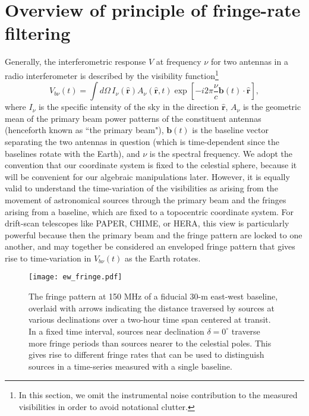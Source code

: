 \documentclass[twocolumn,apj,numberedappendix]{emulateapj}
\newcommand{\rhat}{\hat{\mathbf{r}}}
\begin{document}
\section{Overview of principle of fringe-rate filtering}
\label{sec:overview}
Generally, the interferometric response $V$ at frequency $\nu$ for two antennas in a radio interferometer is described
by the visibility function\footnote{In this section, we omit the instrumental noise contribution to the measured visibilities in order to avoid notational clutter.}
\begin{equation}
\label{eq:originalVis}
V_{b\nu}(t)=\int d\Omega \, {I_\nu(\rhat) A_\nu(\rhat,t) \exp \left[-i2\pi \frac{\nu}{c}  \mathbf{b}(t) \cdot \rhat\right]},
\end{equation}
where $I_\nu$ is the specific intensity of the sky in the direction $\rhat$,
$A_\nu$ is the geometric mean of the primary beam power patterns of the constituent antennas (henceforth known as ``the primary beam"), $\mathbf{ b}(t)$ is the baseline vector separating the two antennas in question (which is time-dependent since the baselines rotate with the Earth), and $\nu$ is the spectral
frequency.
We adopt the convention that our coordinate system is fixed to the celestial sphere, because it will be convenient for our algebraic manipulations later. However, it is equally valid to understand the time-variation of the visibilities as arising from the movement of astronomical sources through the primary beam and the fringes arising from a baseline, which are fixed to a topocentric coordinate system. For drift-scan telescopes like PAPER, CHIME, or HERA, this view is particularly powerful because then the primary beam and the fringe pattern are locked to one another, and may together be considered an enveloped fringe pattern that gives rise
to time-variation in $V_{b\nu}(t)$ as the Earth rotates.

\begin{figure}\centering
\texttt{[image: ew\_fringe.pdf]}
\caption{
The fringe pattern at 150 MHz of a fiducial 30-m east-west baseline, overlaid with arrows indicating
the distance traversed by sources at various declinations over a two-hour time span centered at transit.
In a fixed time interval, sources near declination $\delta=0^\circ$ traverse more 
fringe periods than sources nearer to the celestial poles. This gives rise to different
fringe rates that can be used to distinguish sources in a time-series measured with a single baseline.
}\label{fig:ew_fringe}
\end{figure}
\end{document}
